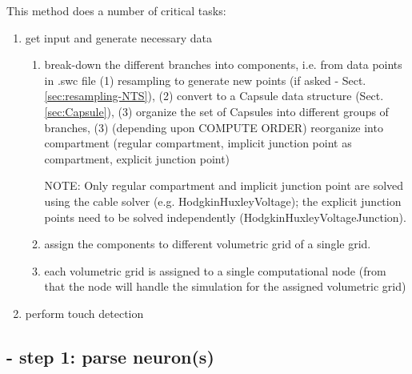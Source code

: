 This method does a number of critical tasks:
\begin{enumerate}
  \item get input and generate necessary data 

\begin{enumerate}
  \item break-down the different branches into components, i.e. from data
  points in .swc file (1) resampling to generate new points (if asked -
  Sect.\ref{sec:resampling-NTS}), (2) convert to a Capsule data structure
  (Sect.\ref{sec:Capsule}), (3) organize the set of Capsules into different groups of branches, (3) (depending upon COMPUTE
  ORDER) reorganize into compartment (regular compartment, implicit junction
  point as compartment, explicit junction point)
  
  NOTE: Only regular compartment and implicit junction point are solved using
  the cable solver (e.g. HodgkinHuxleyVoltage); the explicit junction points
  need to be solved independently (HodgkinHuxleyVoltageJunction).
  
  \item assign the components to different volumetric grid of a single grid.
  
  \item each volumetric grid is assigned to a single computational node (from
  that the node will handle the simulation for the assigned volumetric grid)
\end{enumerate}
  
  \item perform touch detection
\end{enumerate}


\subsection{- step 1: parse neuron(s)}

